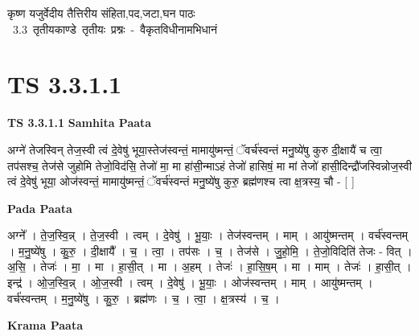 \documentclass[17pt]{extarticle}
\begin{document}
\begin{titlepage}
    \begin{center}
 
\begin{sanskrit}
    { \Large
    कृष्ण यजुर्वेदीय तैत्तिरीय संहिता,पद,जटा,घन पाठः 
    }
    \\
    \vspace{2.5cm}
    \mbox{ \Large
    3.3     तृतीयकाण्डे तृतीयः प्रश्नः - वैकृतविधीनामभिधानं   }
\end{sanskrit}
\end{center}

\end{titlepage}
\tableofcontents
{}
\pagebreak


\section{ TS 3.3.1.1 }

\textbf{TS 3.3.1.1 } \newline
\textbf{Samhita Paata} \newline

अग्ने॑ तेजस्विन् तेज॒स्वी त्वं दे॒वेषु॑ भूया॒स्तेज॑स्वन्तं॒ मामायु॑ष्मन्तं॒ ॅवर्च॑स्वन्तं मनु॒ष्ये॑षु कुरु दी॒क्षायै॑ च त्वा॒ तप॑सश्च॒ तेज॑से जुहोमि तेजो॒विद॑सि॒ तेजो॑ मा॒ मा हा॑सी॒न्माऽहं तेजो॑ हासिषं॒ मा मां तेजो॑ हासी॒दिन्द्रौ॑जस्विन्नोज॒स्वी त्वं दे॒वेषु॑ भूया॒ ओज॑स्वन्तं॒ मामायु॑ष्मन्तं॒ ॅवर्च॑स्वन्तं मनु॒ष्ये॑षु कुरु॒ ब्रह्म॑णश्च त्वा क्ष॒त्रस्य॒ चौ - [  ] \newline

\textbf{Pada Paata} \newline

अग्ने᳚ । ते॒ज॒स्वि॒न्न् । ते॒ज॒स्वी । त्वम् । दे॒वेषु॑ । भू॒याः॒ । तेज॑स्वन्तम् । माम् । आयु॑ष्मन्तम् । वर्च॑स्वन्तम् । म॒नु॒ष्ये॑षु । कु॒रु॒ । दी॒क्षायै᳚ । च॒ । त्वा॒ । तप॑सः । च॒ । तेज॑से । जु॒हो॒मि॒ । ते॒जो॒विदिति॑ तेजः - वित् । अ॒सि॒ । तेजः॑ । मा॒ । मा । हा॒सी॒त् । मा । अ॒हम् । तेजः॑ । हा॒सि॒ष॒म् । मा । माम् । तेजः॑ । हा॒सी॒त् । इन्द्र॑ । ओ॒ज॒स्वि॒न्न् । ओ॒ज॒स्वी । त्वम् । दे॒वेषु॑ । भू॒याः॒ । ओज॑स्वन्तम् । माम् । आयु॑ष्मन्तम् । वर्च॑स्वन्तम् । म॒नु॒ष्ये॑षु । कु॒रु॒ । ब्रह्म॑णः । च॒ । त्वा॒ । क्ष॒त्रस्य॑ । च॒ ।  \newline


\textbf{Krama Paata} \newline
\end{document}
